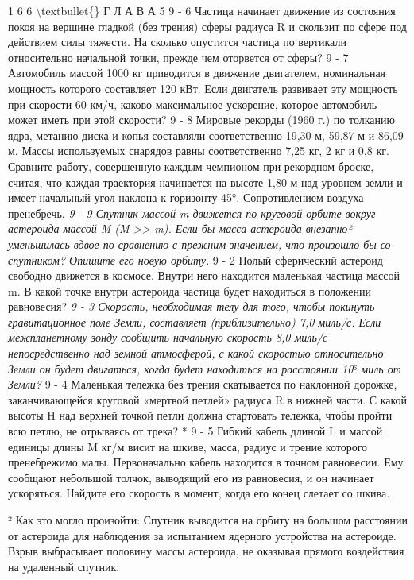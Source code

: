 \documentclass[10pt,oneside]{article}
\begin{document}
1 6 6 \textbackslash{}textbullet\{\} Г Л А В А  5 \emph{ } 9 - 6 Частица начинает движение из состояния покоя на вершине гладкой (без трения) сферы радиуса R и скользит по сфере под действием силы тяжести. На сколько опустится частица по вертикали относительно начальной точки, прежде чем оторвется от сферы? \emph{ } 9 - 7 Автомобиль массой 1000 кг приводится в движение двигателем, номинальная мощность которого составляет 120 кВт. Если двигатель развивает эту мощность при скорости 60 км/ч, каково максимальное ускорение, которое автомобиль может иметь при этой скорости? \emph{ } 9 - 8 Мировые рекорды (1960 г.) по толканию ядра, метанию диска и копья составляли соответственно 19,30 м, 59,87 м и 86,09 м. Массы используемых снарядов равны соответственно 7,25 кг, 2 кг и 0,8 кг. Сравните работу, совершенную каждым чемпионом при рекордном броске, считая, что каждая траектория начинается на высоте 1,80 м над уровнем земли и имеет начальный угол наклона к горизонту 45°. Сопротивлением воздуха пренебречь. \emph{ } \emph{ 9 - 9 Спутник массой m движется по круговой орбите вокруг астероида массой M (M >> m). Если бы масса астероида внезапно² уменьшилась вдвое по сравнению с прежним значением, что произошло бы со спутником? Опишите его новую орбиту. } 9 - 2 Полый сферический астероид свободно движется в космосе. Внутри него находится маленькая частица массой m. В какой точке внутри астероида частица будет находиться в положении равновесия? \emph{ 9 - 3 Скорость, необходимая телу для того, чтобы покинуть гравитационное поле Земли, составляет (приблизительно) 7,0 миль/с. Если межпланетному зонду сообщить начальную скорость 8,0 миль/с непосредственно над земной атмосферой, с какой скоростью относительно Земли он будет двигаться, когда будет находиться на расстоянии 10⁶ миль от Земли? } 9 - 4 Маленькая тележка без трения скатывается по наклонной дорожке, заканчивающейся круговой «мертвой петлей» радиуса R в нижней части. С какой высоты H над верхней точкой петли должна стартовать тележка, чтобы пройти всю петлю, не отрываясь от трека? * 9 - 5 Гибкий кабель длиной L и массой единицы длины M кг/м висит на шкиве, масса, радиус и трение которого пренебрежимо малы. Первоначально кабель находится в точном равновесии. Ему сообщают небольшой толчок, выводящий его из равновесия, и он начинает ускоряться. Найдите его скорость в момент, когда его конец слетает со шкива.\par

² Как это могло произойти: Спутник выводится на орбиту на большом расстоянии от астероида для наблюдения за испытанием ядерного устройства на астероиде. Взрыв выбрасывает половину массы астероида, не оказывая прямого воздействия на удаленный спутник.\par
\end{document}
